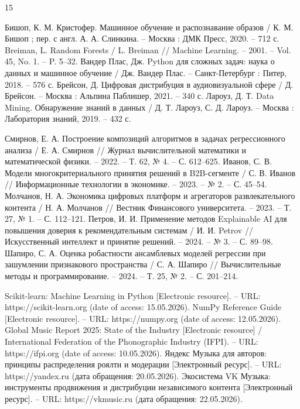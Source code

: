 \documentclass[14pt, a4paper]{extarticle}
\begin{document}
\newpage
\begin{thebibliography}{15}

 Бишоп, К. М. Кристофер. Машинное обучение и распознавание образов / К. М. Бишоп ; пер. с англ. А. А. Слинкина. – Москва : ДМК Пресс, 2020. – 712 с.
 Breiman, L. Random Forests / L. Breiman // Machine Learning. – 2001. – Vol. 45, No. 1. – P. 5–32.
 Вандер Плас, Дж. Python для сложных задач: наука о данных и машинное обучение / Дж. Вандер Плас. – Санкт-Петербург : Питер, 2018. – 576 с.
 Брейсон, Д. Цифровая дистрибуция в аудиовизуальной сфере / Д. Брейсон. – Москва : Альпина Паблишер, 2021. – 340 с.
 Лароуз, Д. Т. Data Mining. Обнаружение знаний в данных / Д. Т. Лароуз, С. Д. Лароуз. – Москва : Лаборатория знаний, 2019. – 432 с.

 Смирнов, Е. А. Построение композиций алгоритмов в задачах регрессионного анализа / Е. А. Смирнов // Журнал вычислительной математики и математической физики. – 2022. – Т. 62, № 4. – С. 612–625.
 Иванов, С. В. Модели многокритериального принятия решений в B2B-сегменте / С. В. Иванов // Информационные технологии в экономике. – 2023. – № 2. – С. 45–54.
 Молчанов, Н. А. Экономика цифровых платформ и агрегаторов развлекательного контента / Н. А. Молчанов // Вестник Финансового университета. – 2023. – Т. 27, № 1. – С. 112–121.
 Петров, И. И. Применение методов Explainable AI для повышения доверия к рекомендательным системам / И. И. Petrov // Искусственный интеллект и принятие решений. – 2024. – № 3. – С. 89–98.
 Шапиро, С. А. Оценка робастности ансамблевых моделей регрессии при зашумлении признакового пространства / С. А. Шапиро // Вычислительные методы и программирование. – 2024. – Т. 25, № 2. – С. 201–214.

 Scikit-learn: Machine Learning in Python [Electronic resource]. – URL: https://scikit-learn.org (date of access: 15.05.2026).
 NumPy Reference Guide [Electronic resource]. – URL: https://numpy.org (date of access: 12.05.2026).
 Global Music Report 2025: State of the Industry [Electronic resource] / International Federation of the Phonographic Industry (IFPI). – URL: https://ifpi.org (date of access: 10.05.2026).
 Яндекс Музыка для авторов: принципы распределения роялти и модерации [Электронный ресурс]. – URL: https://yandex.ru (дата обращения: 20.05.2026).
 Экосистема VK Музыка: инструменты продвижения и дистрибуции независимого контента [Электронный ресурс]. – URL: https://vkmusic.ru (дата обращения: 22.05.2026).

\end{thebibliography}
\end{document}
